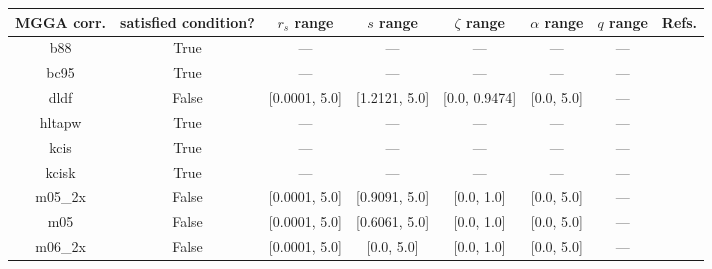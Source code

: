 \begin{tabular}{|c|c|c|c|c|c|c|l|}
\hline
    MGGA corr. &  satisfied condition? &       $r_s$ range &         $s$ range &     $\zeta$ range & $\alpha$ range & $q$ range  &                                                                               Refs. \\ \hline
           b88 &                  True &               --- &               --- &               --- &            --- &        --- &                                                               \cite{Becke1988_1053} \\ \hline
          bc95 &                  True &               --- &               --- &               --- &            --- &        --- &                                                               \cite{Becke1996_1040} \\ \hline
          dldf &                 False &     [0.0001, 5.0] &     [1.2121, 5.0] &     [0.0, 0.9474] &     [0.0, 5.0] &        --- &                                                            \cite{Pernal2009_263201} \\ \hline
        hltapw &                  True &               --- &               --- &               --- &            --- &        --- &                                                              \cite{Lehtola2021_943} \\ \hline
          kcis &                  True &               --- &               --- &               --- &            --- &        --- &  \cite{Rey1998_581,Krieger1999_463,Krieger2001_48,Kurth1999_889,Toulouse2002_10465} \\ \hline
         kcisk &                  True &               --- &               --- &               --- &            --- &        --- &  \cite{Rey1998_581,Krieger1999_463,Krieger2001_48,Kurth1999_889,Toulouse2002_10465} \\ \hline
       m05\_2x &                 False &     [0.0001, 5.0] &     [0.9091, 5.0] &        [0.0, 1.0] &     [0.0, 5.0] &        --- &                                                                 \cite{Zhao2006_364} \\ \hline
           m05 &                 False &     [0.0001, 5.0] &     [0.6061, 5.0] &        [0.0, 1.0] &     [0.0, 5.0] &        --- &                                                              \cite{Zhao2005_161103} \\ \hline
       m06\_2x &                 False &     [0.0001, 5.0] &        [0.0, 5.0] &        [0.0, 1.0] &     [0.0, 5.0] &        --- &                                                                 \cite{Zhao2008_215} \\ \hline

\end{tabular}
